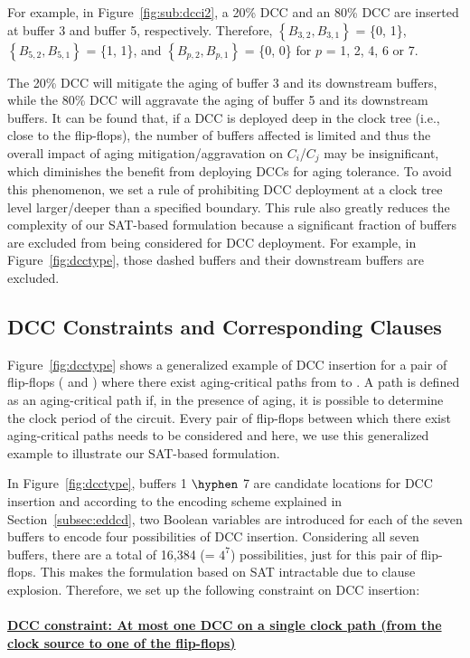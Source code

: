 For example, in Figure~\ref{fig:sub:dcci2}, a 20\% DCC and an 80\% DCC are inserted at buffer 3 and buffer 5, respectively. Therefore, $\left\{B_{3,2}, B_{3,1}\right\}$ = \{0, 1\}, $\left\{B_{5,2}, B_{5,1}\right\}$ = \{1, 1\}, and $\left\{B_{p,2}, B_{p,1}\right\}$ = \{0, 0\} for $p$ = 1, 2, 4, 6 or 7.

The 20\% DCC will mitigate the aging of buffer 3 and its downstream buffers, while the 80\% DCC will aggravate the aging of buffer 5 and its downstream buffers. It can be found that, if a DCC is deployed deep in the clock tree (i.e., close to the flip-flops), the number of buffers affected is limited and thus the overall impact of aging mitigation/aggravation on $C_i$/$C_j$ may be insignificant, which diminishes the benefit from deploying DCCs for aging tolerance. To avoid this phenomenon, we set a rule of prohibiting DCC deployment at a clock tree level larger/deeper than a specified boundary. This rule also greatly reduces the complexity of our SAT-based formulation because a significant fraction of buffers are excluded from being considered for DCC deployment. For example, in Figure~\ref{fig:dcctype}, those dashed buffers and their downstream buffers are excluded. 


\subsection{DCC Constraints and Corresponding Clauses}
\label{subsec:dccccc}

Figure~\ref{fig:dcctype} shows a generalized example of DCC insertion for a pair of flip-flops ( and ) where there exist aging-critical paths from  to . A path is defined as an aging-critical path if, in the presence of aging, it is possible to determine the clock period of the circuit. Every pair of flip-flops between which there exist aging-critical paths needs to be considered and here, we use this generalized example to illustrate our SAT-based formulation.

In Figure~\ref{fig:dcctype}, buffers 1 $\hyphen$ 7 are candidate locations for DCC insertion and according to the encoding scheme explained in Section~\ref{subsec:eddcd}, two Boolean variables are introduced for each of the seven buffers to encode four possibilities of DCC insertion. Considering all seven buffers, there are a total of 16,384 (= $4^7$) possibilities, just for this pair of flip-flops. This makes the formulation based on SAT intractable due to clause explosion. Therefore, we set up the following constraint on DCC insertion: \\ \\
\textbf{\uline{DCC constraint: At most one DCC on a single clock path (from the clock source to one of the flip-flops)}}

